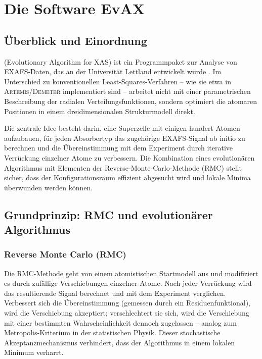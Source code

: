 \chapter{Die Software EvAX}
\label{ch:evax}

\section{Überblick und Einordnung}

\evax{} (Evolutionary Algorithm for XAS) ist ein Programmpaket zur
Analyse von EXAFS-Daten, das an der Universität Lettland entwickelt
wurde \cite{Timoshenko2009, Timoshenko2012a, Timoshenko2012b}.
Im Unterschied zu konventionellen Least-Squares-Verfahren
-- wie sie etwa in \textsc{Artemis}/\textsc{Demeter}
\cite{Ravel2005} implementiert sind -- arbeitet \evax{} nicht mit
einer parametrischen Beschreibung der radialen Verteilungsfunktionen,
sondern optimiert die atomaren Positionen in einem dreidimensionalen
Strukturmodell direkt.

Die zentrale Idee besteht darin, eine Superzelle mit einigen hundert
Atomen aufzubauen, für jeden Absorbertyp das zugehörige EXAFS-Signal
ab initio zu berechnen und die Übereinstimmung mit dem Experiment
durch iterative Verrückung einzelner Atome zu verbessern.
Die Kombination eines evolutionären Algorithmus mit Elementen der
Reverse-Monte-Carlo-Methode (RMC) stellt sicher, dass der
Konfigurationsraum effizient abgesucht wird und lokale Minima
überwunden werden können.

\section{Grundprinzip: RMC und evolutionärer Algorithmus}

\subsection{Reverse Monte Carlo (RMC)}

Die RMC-Methode \cite{McGreevy1988} geht von einem atomistischen
Startmodell aus und modifiziert es durch zufällige Verschiebungen
einzelner Atome.
Nach jeder Verrückung wird das resultierende Signal berechnet und
mit dem Experiment verglichen.
Verbessert sich die Übereinstimmung (gemessen durch ein
Residuenfunktional), wird die Verschiebung akzeptiert; verschlechtert
sie sich, wird die Verschiebung mit einer bestimmten
Wahrscheinlichkeit dennoch zugelassen -- analog zum
Metropolis-Kriterium in der statistischen Physik.
Dieser stochastische Akzeptanzmechanismus verhindert, dass der
Algorithmus in einem lokalen Minimum verharrt.

